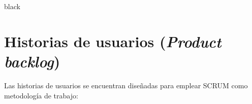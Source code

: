 \documentclass[11pt]{charter}
\begin{document}
\begin{consigna}{black}
\begin{enumerate}
\begin{enumerate}
	\end{enumerate}		
\end{enumerate}
%
%
%
%
%
\end{consigna}



\newpage
{}
\storeareas\landscapevalues
\addtolength{\oddsidemargin}{-.875in}
\vspace*{2px}

\section{Historias de usuarios (\textit{Product backlog})}
\label{sec:backlog}
Las historias de usuarios se encuentran diseñadas para emplear SCRUM como metodología de trabajo: 
\end{document}
